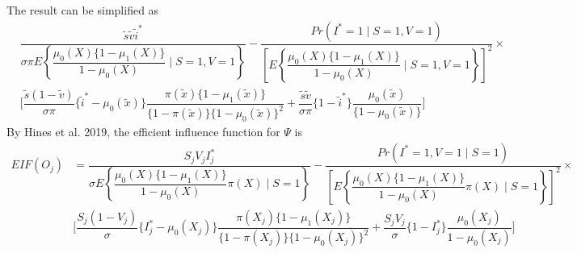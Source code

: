 \documentclass{article}
\begin{document}
The result can be simplified as
\begin{align*}
    &\dfrac{\tilde s\tilde v\tilde i^*}{\sigma\pi E\left\{\dfrac{\mu_0(X)\{1 - \mu_1(X)\}}{1 - \mu_0(X)}\mid S=1, V=1\right\}} - \dfrac{Pr(I^*=1\mid S=1, V=1)}{\left[E\left\{\dfrac{\mu_0(X)\{1 - \mu_1(X)\}}{1 - \mu_0(X)}\mid S=1, V=1\right\}\right]^2}\times \\
    &\bigg[ \dfrac{\tilde s(1 - \tilde v)}{\sigma\pi}\{\tilde i^* - \mu_0(\tilde x)\}\dfrac{\pi(\tilde x)\{1 - \mu_1(\tilde x)\}}{\{1 - \pi(\tilde x)\}\{1 - \mu_0(\tilde x)\}^2} + \dfrac{\tilde s \tilde v}{\sigma\pi}\{1-\tilde i^*\}\dfrac{\mu_0(\tilde x)}{\{1 - \mu_0(\tilde x)\}}\bigg]
\end{align*}
By Hines et al. 2019, the efficient influence function for $\Psi$ is
\begin{align*}
    EIF(O_j) &=\dfrac{S_jV_j I^*_j}{\sigma E\left\{\dfrac{\mu_0(X)\{1 - \mu_1(X)\}}{1 - \mu_0(X)}\pi(X)\mid S=1\right\}} - \dfrac{Pr(I^*=1, V=1\mid S=1)}{\left[E\left\{\dfrac{\mu_0(X)\{1 - \mu_1(X)\}}{1 - \mu_0(X)}\pi(X)\mid S=1\right\}\right]^2}\times \\
    &\bigg[ \dfrac{S_j(1 - V_j)}{\sigma}\{I^*_j - \mu_0(X_j)\}\dfrac{\pi(X_j)\{1 - \mu_1(X_j)\}}{\{1 - \pi(X_j)\}\{1 - \mu_0(X_j)\}^2} + \dfrac{S_jV_j}{\sigma}\{1-I^*_j\}\dfrac{\mu_0(X_j)}{1-\mu_0(X_j)}\bigg] 
\end{align*}
\end{document}
